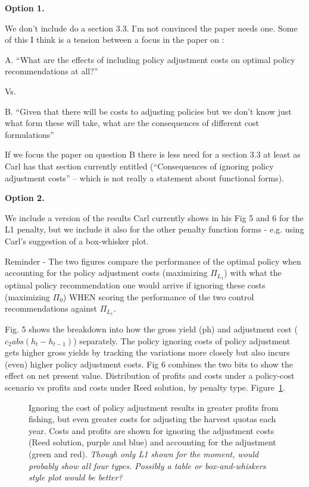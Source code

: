 \documentclass[authoryear, review, 12pt]{elsarticle}
\newcommand{\cdb}[1]{{\it \color{darkgreen} #1}}
\newcommand{\pa}[1]{{\it \color{darkblue} #1}}
\begin{document}
\pa{
   
  \textbf{Option 1.}

  We don’t include do a section 3.3. I’m not convinced the paper needs one. Some of this I think is a tension between a focus in the paper on :

  A.      ``What are the effects of including policy adjustment costs on optimal policy recommendations at all?''

  Vs.

B.      ``Given that there will be costs to adjusting policies but we don’t know just what form these will take, what are the consequences of different cost formulations''



If we focus the paper on question B there is less need for a section 3.3 at least as Carl has that section currently entitled (``Consequences of ignoring policy adjustment costs'' – which is not really a statement about functional forms).
   

\textbf{Option 2.}

  We include a version of the results Carl currently shows in his Fig 5 and 6 for the L1 penalty, but we include it also for the other penalty function forms - e.g. using Carl’s suggestion of a box-whisker plot.
   
Reminder - The two figures compare the performance of the optimal policy when accounting for the policy adjustment costs (maximizing $\Pi_{L_1}$) with what the optimal policy recommendation one would arrive if ignoring these costs (maximizing $\Pi_0$) WHEN scoring the performance of the two control recommendations against $\Pi_{L_1}$.

Fig. 5 shows the breakdown into how the gross yield (ph) and adjustment cost ($c_2 abs(h_t-h_{t-1})$) separately. The policy ignoring costs of policy adjustment gets higher gross yields by tracking the variations more closely but also incurs (even) higher policy adjustment costs. Fig 6 combines the two bits to show the effect on net present value. Distribution of profits and costs under a policy-cost scenario vs profits and costs under Reed solution, by penalty type. Figure~\ref{fig:profits_costs}.
}

\begin{figure}
  \begin{center}
    \caption{Ignoring the cost of policy adjustment results in greater profits from fishing, but even greater costs for adjusting the harvest quotas each year.  Costs and profits are shown for ignoring the adjustment costs (Reed solution, purple and blue) and accounting for the adjustment (green and red).  \cdb{Though only L1 shown for the moment, would probably show all four types.  Possibly a table or box-and-whiskers style plot would be better?}}\label{fig:profits_costs}
  \end{center}
\end{figure}
\end{document}
